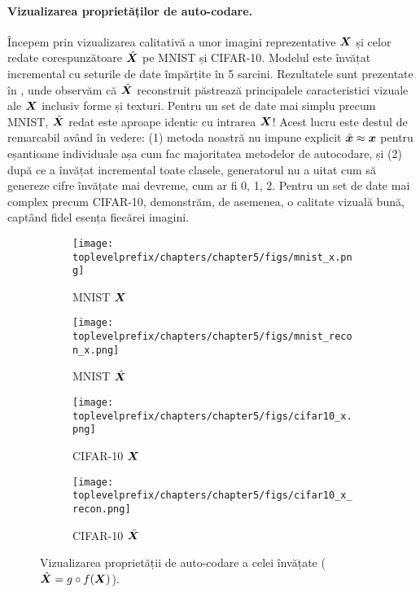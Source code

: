 \documentclass[../../book-main_ro.tex]{subfiles}
\begin{document}
\paragraph{Vizualizarea proprietăților de auto-codare.}
Începem prin vizualizarea calitativă a unor imagini reprezentative $\bm{X}$ și celor redate corespunzătoare $\hat{\bm{X}}$ pe MNIST și CIFAR-10. Modelul este învățat incremental cu seturile de date împărțite în 5 sarcini. Rezultatele sunt prezentate în , unde observăm că $\hat{\bm{X}}$ reconstruit păstrează principalele caracteristici vizuale ale $\bm{X}$ inclusiv forme și texturi. Pentru un set de date mai simplu precum MNIST, $\hat{\bm{X}}$ redat este aproape identic cu intrarea $\bm{X}$! Acest lucru este destul de remarcabil având în vedere: (1) metoda noastră nu impune explicit $\hat{\bm{x}} \approx \bm{x}$ pentru eșantioane individuale așa cum fac majoritatea metodelor de autocodare, și (2) după ce a învățat incremental toate clasele, generatorul nu a uitat cum să genereze cifre învățate mai devreme, cum ar fi 0, 1, 2. Pentru un set de date mai complex precum CIFAR-10, demonstrăm, de asemenea, o calitate vizuală bună, captând fidel esența fiecărei imagini.

\begin{figure}[t]
    \begin{subfigure}[t]{0.20\textwidth}
        \centering
        \texttt{[image: \\toplevelprefix/chapters/chapter5/figs/mnist\_x.png]}
        \caption{MNIST $\bm{X}$}
    \end{subfigure}
    \hfill
    \begin{subfigure}[t]{0.20\textwidth}
        \centering
        \texttt{[image: \\toplevelprefix/chapters/chapter5/figs/mnist\_recon\_x.png]}
        \caption{MNIST $\hat{\bm{X}}$}
    \end{subfigure}
    \hfill
    \begin{subfigure}[t]{0.20\textwidth}
        \centering
        \texttt{[image: \\toplevelprefix/chapters/chapter5/figs/cifar10\_x.png]}
        \caption{CIFAR-10 $\bm{X}$}
    \end{subfigure}
    \hfill
    \begin{subfigure}[t]{0.20\textwidth}
        \centering
        \texttt{[image: \\toplevelprefix/chapters/chapter5/figs/cifar10\_x\_recon.png]}
        \caption{CIFAR-10 $\hat{\bm{X}}$}
    \end{subfigure}
    \caption{\small Vizualizarea proprietății de auto-codare a celei învățate ($\hat{\bm{X}} = g\circ f(\bm{X})$). }
        \label{fig:justify_xhat_equals_x_incremental}
\end{figure}
\end{document}

